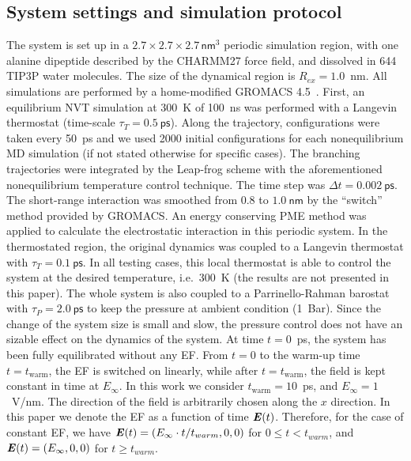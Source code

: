 \documentclass[a4paper,preprint,unsortedaddress,onecolumn]{revtex4-1}
\newcommand{\vect}[1]{\textbf{\textit{#1}}}
\begin{document}
\subsection{System settings and simulation protocol}
The system is set up in a $2.7\times 2.7\times
2.7\, \textsf{nm}^3$ periodic simulation region, with one alanine dipeptide
described by the CHARMM27 force field, and dissolved in 644 TIP3P
water molecules.
The size of the  dynamical region is $R_{ex} = 1.0$~nm.
All simulations are performed by a home-modified GROMACS 4.5~\cite{pronk2013gromacs}.
First, an equilibrium NVT simulation at 300~K of
100~\textsf{ns} was performed with a Langevin thermostat (time-scale
$\tau_T = 0.5~\textsf{ps}$).  Along the trajectory, configurations were taken every
50~\textsf{ps} and we used 2000 initial configurations for each nonequilibrium
MD simulation (if not stated otherwise for specific cases).
The branching trajectories were integrated by the
Leap-frog scheme with the aforementioned nonequilibrium
temperature control technique.  The
time step was $\Delta t = 0.002~\textsf{ps}$. The short-range
interaction was smoothed from $0.8$ to $1.0~\textsf{nm}$ by the
``switch'' method provided by GROMACS.  An energy conserving PME
method was applied to calculate the electrostatic interaction in this
periodic system. In the thermostated region, the original dynamics was
coupled to a Langevin thermostat with $\tau_T = 0.1~\textsf{ps}$.
  In all testing cases, this local thermostat is able to control
  the system at the desired temperature, i.e.~300~K (the results
  are not presented in this paper).
The whole system is also coupled to a Parrinello-Rahman barostat~\cite{parrinello1981polymorphic} with $\tau_P = 2.0~\textsf{ps}$ to keep
the pressure at ambient condition (1~Bar). Since the
change of the system size is small and slow, the pressure control
does not have an sizable effect on the
dynamics of the system.
At time $t=0$~ps, the system
has been fully equilibrated without any EF. From $t=0$ to
the warm-up time $t=t_{\textrm{warm}}$, the EF is switched on linearly, while
after $t=t_{\textrm{warm}}$, the field is kept constant in time at
$E_{\infty}$.  In this work we consider $t_{\textrm{warm}} = 10$~ps,
and $E_{\infty} = 1$~V/nm.
The direction of the field is arbitrarily chosen along the
$x$ direction.
In this paper we denote the
EF as a function of time $\vect E(t)$.
Therefore, for the case of constant EF, we have
$\vect E(t) = (E_\infty\cdot t/t_{warm},0,0)$ for $0\leq t < t_{warm}$, and 
$\vect E(t) = (E_\infty,0,0)$
for $t \geq t_{warm}$.
\end{document}
